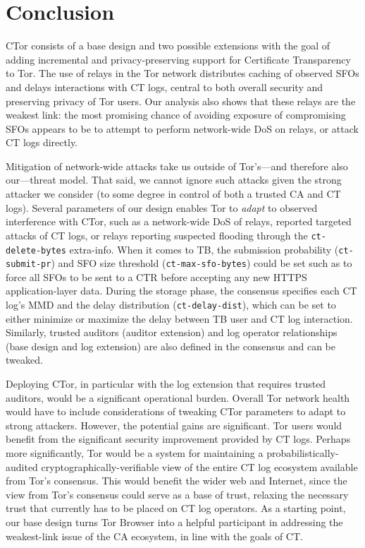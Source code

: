 \section{Conclusion} \label{sec:conclusion}
CTor consists of a base design and two possible extensions with the goal of
adding incremental and privacy-preserving support for Certificate Transparency
to Tor. The use of relays in the Tor network distributes caching of observed
SFOs and delays interactions with CT logs, central to both overall security and
preserving privacy of Tor users. Our analysis also shows that these relays are
the weakest link: the most promising chance of avoiding exposure of compromising
SFOs appears to be to attempt to perform network-wide DoS on relays, or attack
CT logs directly. 

Mitigation of network-wide attacks take us outside of Tor's---and therefore also
our---threat model. That said, we cannot ignore such attacks given the strong
attacker we consider (to some degree in control of both a trusted CA and CT
logs). Several parameters of our design enables Tor to \emph{adapt} to observed
interference with CTor, such as a network-wide DoS of relays, reported targeted
attacks of CT logs, or relays reporting suspected flooding through the
\texttt{ct-delete-bytes}  extra-info. When it comes to TB, the submission
probability (\texttt{ct-submit-pr}) and SFO size threshold
(\texttt{ct-max-sfo-bytes}) could be set such as to force all SFOs to be sent to
a CTR before accepting any new HTTPS application-layer data. During the storage
phase, the consensus specifies each CT log's MMD and the delay distribution
(\texttt{ct-delay-dist}), which can be set to either minimize or maximize the
delay between TB user and CT log interaction. Similarly, trusted auditors
(auditor extension) and log operator relationships (base design and log
extension) are also defined in the consensus and can be tweaked.

Deploying CTor, in particular with the log extension that requires trusted
auditors, would be a significant operational burden. Overall Tor network health
would have to include considerations of tweaking CTor parameters to adapt to
strong attackers. However, the potential gains are significant. Tor users would
benefit from the significant security improvement provided by CT logs. Perhaps
more significantly, Tor would be a system for maintaining a
probabilistically-audited cryptographically-verifiable view of the entire CT log
ecosystem available from Tor’s consensus. This would benefit the wider web and
Internet, since the view from Tor's consensus could serve as a base of trust,
relaxing the necessary trust that currently has to be placed on CT log
operators. As a starting point, our base design turns Tor Browser into a helpful
participant in addressing the weakest-link issue of the CA ecosystem, in line
with the goals of CT.
